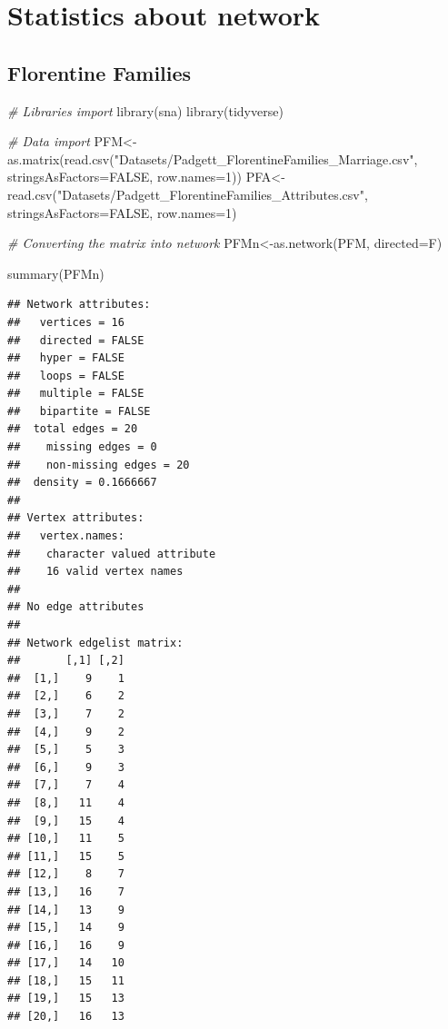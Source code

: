 \documentclass[
  notitlepage,
  onecolumn,
  openany]{book}
\newenvironment{Shaded}{\begin{snugshade}}{\end{snugshade}}
\newcommand{\AttributeTok}[1]{\textcolor[rgb]{0.77,0.63,0.00}{#1}}
\newcommand{\CommentTok}[1]{\textcolor[rgb]{0.56,0.35,0.01}{\textit{#1}}}
\newcommand{\ConstantTok}[1]{\textcolor[rgb]{0.00,0.00,0.00}{#1}}
\newcommand{\DecValTok}[1]{\textcolor[rgb]{0.00,0.00,0.81}{#1}}
\newcommand{\FunctionTok}[1]{\textcolor[rgb]{0.00,0.00,0.00}{#1}}
\newcommand{\NormalTok}[1]{#1}
\newcommand{\OtherTok}[1]{\textcolor[rgb]{0.56,0.35,0.01}{#1}}
\newcommand{\StringTok}[1]{\textcolor[rgb]{0.31,0.60,0.02}{#1}}
\begin{document}
\hypertarget{statistics-about-network}{%
\chapter{Statistics about network}\label{statistics-about-network}}

\hypertarget{florentine-families}{%
\section{Florentine Families}\label{florentine-families}}

\begin{Shaded}
\begin{Highlighting}[]
\CommentTok{\# Libraries import}
\FunctionTok{library}\NormalTok{(sna)}
\FunctionTok{library}\NormalTok{(tidyverse)}

\CommentTok{\# Data import}
\NormalTok{PFM}\OtherTok{\textless{}{-}}\FunctionTok{as.matrix}\NormalTok{(}\FunctionTok{read.csv}\NormalTok{(}\StringTok{"Datasets/Padgett\_FlorentineFamilies\_Marriage.csv"}\NormalTok{,}
                        \AttributeTok{stringsAsFactors=}\ConstantTok{FALSE}\NormalTok{, }\AttributeTok{row.names=}\DecValTok{1}\NormalTok{))}
\NormalTok{PFA}\OtherTok{\textless{}{-}}\FunctionTok{read.csv}\NormalTok{(}\StringTok{"Datasets/Padgett\_FlorentineFamilies\_Attributes.csv"}\NormalTok{,}
              \AttributeTok{stringsAsFactors=}\ConstantTok{FALSE}\NormalTok{, }\AttributeTok{row.names=}\DecValTok{1}\NormalTok{)}

\CommentTok{\# Converting the matrix into network}
\NormalTok{PFMn}\OtherTok{\textless{}{-}}\FunctionTok{as.network}\NormalTok{(PFM, }\AttributeTok{directed=}\NormalTok{F)}

\FunctionTok{summary}\NormalTok{(PFMn)}
\end{Highlighting}
\end{Shaded}

\begin{verbatim}
## Network attributes:
##   vertices = 16
##   directed = FALSE
##   hyper = FALSE
##   loops = FALSE
##   multiple = FALSE
##   bipartite = FALSE
##  total edges = 20 
##    missing edges = 0 
##    non-missing edges = 20 
##  density = 0.1666667 
## 
## Vertex attributes:
##   vertex.names:
##    character valued attribute
##    16 valid vertex names
## 
## No edge attributes
## 
## Network edgelist matrix:
##       [,1] [,2]
##  [1,]    9    1
##  [2,]    6    2
##  [3,]    7    2
##  [4,]    9    2
##  [5,]    5    3
##  [6,]    9    3
##  [7,]    7    4
##  [8,]   11    4
##  [9,]   15    4
## [10,]   11    5
## [11,]   15    5
## [12,]    8    7
## [13,]   16    7
## [14,]   13    9
## [15,]   14    9
## [16,]   16    9
## [17,]   14   10
## [18,]   15   11
## [19,]   15   13
## [20,]   16   13
\end{verbatim}
\end{document}
